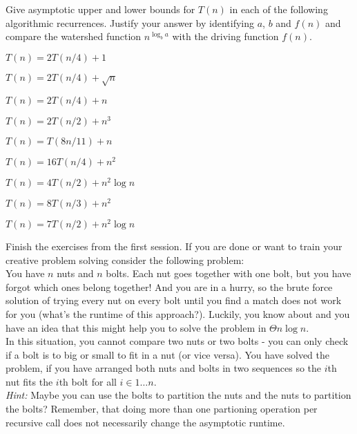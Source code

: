 \documentclass{article}
\begin{document}
\thispagestyle{fancy}

\begin{Exercise}

    \ExeText
    Give asymptotic upper and lower bounds for $T(n)$ in each of the following
    algorithmic recurrences. Justify your answer by identifying $a$, $b$ and
    $f(n)$ and compare the watershed function $n^{\log_b a}$ with the driving
    function $f(n)$.

    \Question
    $T(n) = 2T(n/4) + 1$

    \Question
    $T(n) = 2T(n/4) + \sqrt{n}$

    \Question
    $T(n) = 2T(n/4) + n$

    \Question
    $T(n) = 2T(n/2) + n^3$

    \Question
    $T(n) = T(8n/11) + n$

    \Question
    $T(n) = 16T(n/4) + n^2$

    \Question
    $T(n) = 4T(n/2) + n^2 \log n$

    \Question
    $T(n) = 8T(n/3) + n^2$

    \Question
    $T(n) = 7T(n/2) + n^2 \log n$

\end{Exercise}

\begin{Exercise}
    
    \ExeText
    \noindent
    Finish the exercises from the first session. If you are done or want to train
    your creative problem solving consider the following problem: \\

    \noindent
    You have $n$ nuts and $n$ bolts. Each nut goes together with one bolt, but
    you have forgot which ones belong together! And you are in a hurry, so the
    brute force solution of trying every nut on every bolt until you find a match
    does not work for you (what's the runtime of this approach?). Luckily, you
    know about  and you have an idea that this might help you to
    solve the problem in $\Theta{n \log n}$. \\

    \noindent
    In this situation, you cannot compare two nuts or two bolts - you can only
    check if a bolt is to big or small to fit in a nut (or vice versa). You have
    solved the problem, if you have arranged both nuts and bolts in two
    sequences so the $i$th nut fits the $i$th bolt for all $i \in 1\ldots n$. \\

    \noindent
    \textit{Hint:} Maybe you can use the bolts to partition the nuts and the
    nuts to partition the bolts? Remember, that doing more than one partioning
    operation per recursive call does not necessarily change the asymptotic
    runtime.
\end{Exercise}
\end{document}
